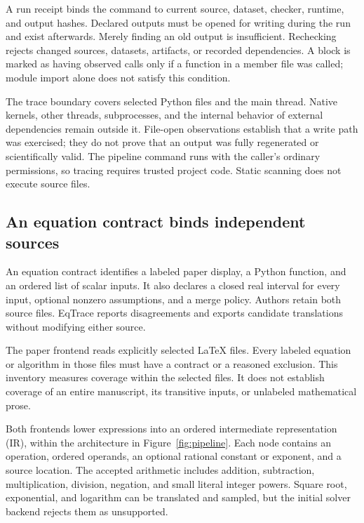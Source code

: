 A run receipt binds the command to current source, dataset, checker, runtime, and output hashes. Declared outputs must be opened for writing during the run and exist afterwards. Merely finding an old output is insufficient. Rechecking rejects changed sources, datasets, artifacts, or recorded dependencies. A block is marked as having observed calls only if a function in a member file was called; module import alone does not satisfy this condition.

The trace boundary covers selected Python files and the main thread. Native kernels, other threads, subprocesses, and the internal behavior of external dependencies remain outside it. File-open observations establish that a write path was exercised; they do not prove that an output was fully regenerated or scientifically valid. The pipeline command runs with the caller's ordinary permissions, so tracing requires trusted project code. Static scanning does not execute source files.

\subsection{An equation contract binds independent sources}
An equation contract identifies a labeled paper display, a Python function, and an ordered list of scalar inputs. It also declares a closed real interval for every input, optional nonzero assumptions, and a merge policy. Authors retain both source files. EqTrace reports disagreements and exports candidate translations without modifying either source.

The paper frontend reads explicitly selected LaTeX files. Every labeled equation or algorithm in those files must have a contract or a reasoned exclusion. This inventory measures coverage within the selected files. It does not establish coverage of an entire manuscript, its transitive inputs, or unlabeled mathematical prose.

Both frontends lower expressions into an ordered intermediate representation (IR), within the architecture in Figure~\ref{fig:pipeline}. Each node contains an operation, ordered operands, an optional rational constant or exponent, and a source location. The accepted arithmetic includes addition, subtraction, multiplication, division, negation, and small literal integer powers. Square root, exponential, and logarithm can be translated and sampled, but the initial solver backend rejects them as unsupported.

